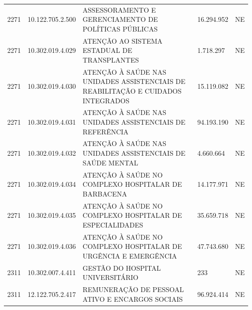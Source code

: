 \documentclass{article}
\begin{document}
\begin{longtable}[c]{m{1cm}|m{2cm}|m{10cm}|m{2cm}|m{1cm}}
\multicolumn{1}{C{1cm}|}{2271} & \multicolumn{1}{C{2cm}|}{10.122.705.2.500} & \multicolumn{1}{L{10cm}|}{ASSESSORAMENTO E GERENCIAMENTO DE POLÍTICAS PÚBLICAS} & \multicolumn{1}{R{2cm}|}{16.294.952} & \multicolumn{1}{C{1cm}}{NE} \\
\multicolumn{1}{C{1cm}|}{2271} & \multicolumn{1}{C{2cm}|}{10.302.019.4.029} & \multicolumn{1}{L{10cm}|}{ATENÇÃO AO SISTEMA ESTADUAL DE TRANSPLANTES} & \multicolumn{1}{R{2cm}|}{1.718.297} & \multicolumn{1}{C{1cm}}{NE} \\
\multicolumn{1}{C{1cm}|}{2271} & \multicolumn{1}{C{2cm}|}{10.302.019.4.030} & \multicolumn{1}{L{10cm}|}{ATENÇÃO À SAÚDE NAS UNIDADES ASSISTENCIAIS DE REABILITAÇÃO E CUIDADOS INTEGRADOS} & \multicolumn{1}{R{2cm}|}{15.119.082} & \multicolumn{1}{C{1cm}}{NE} \\
\multicolumn{1}{C{1cm}|}{2271} & \multicolumn{1}{C{2cm}|}{10.302.019.4.031} & \multicolumn{1}{L{10cm}|}{ATENÇÃO À SAÚDE NAS UNIDADES ASSISTENCIAIS DE REFERÊNCIA} & \multicolumn{1}{R{2cm}|}{94.193.190} & \multicolumn{1}{C{1cm}}{NE} \\
\multicolumn{1}{C{1cm}|}{2271} & \multicolumn{1}{C{2cm}|}{10.302.019.4.032} & \multicolumn{1}{L{10cm}|}{ATENÇÃO À SAÚDE NAS UNIDADES ASSISTENCIAIS DE SAÚDE MENTAL} & \multicolumn{1}{R{2cm}|}{4.660.664} & \multicolumn{1}{C{1cm}}{NE} \\
\multicolumn{1}{C{1cm}|}{2271} & \multicolumn{1}{C{2cm}|}{10.302.019.4.034} & \multicolumn{1}{L{10cm}|}{ATENÇÃO À SAÚDE NO COMPLEXO HOSPITALAR DE BARBACENA} & \multicolumn{1}{R{2cm}|}{14.177.971} & \multicolumn{1}{C{1cm}}{NE} \\
\multicolumn{1}{C{1cm}|}{2271} & \multicolumn{1}{C{2cm}|}{10.302.019.4.035} & \multicolumn{1}{L{10cm}|}{ATENÇÃO À SAÚDE NO COMPLEXO HOSPITALAR DE ESPECIALIDADES} & \multicolumn{1}{R{2cm}|}{35.659.718} & \multicolumn{1}{C{1cm}}{NE} \\
\multicolumn{1}{C{1cm}|}{2271} & \multicolumn{1}{C{2cm}|}{10.302.019.4.036} & \multicolumn{1}{L{10cm}|}{ATENÇÃO À SAÚDE NO COMPLEXO HOSPITALAR DE URGÊNCIA E EMERGÊNCIA} & \multicolumn{1}{R{2cm}|}{47.743.680} & \multicolumn{1}{C{1cm}}{NE} \\
\multicolumn{1}{C{1cm}|}{2311} & \multicolumn{1}{C{2cm}|}{10.302.007.4.411} & \multicolumn{1}{L{10cm}|}{GESTÃO DO HOSPITAL UNIVERSITÁRIO} & \multicolumn{1}{R{2cm}|}{233} & \multicolumn{1}{C{1cm}}{NE} \\
\multicolumn{1}{C{1cm}|}{2311} & \multicolumn{1}{C{2cm}|}{12.122.705.2.417} & \multicolumn{1}{L{10cm}|}{REMUNERAÇÃO DE PESSOAL ATIVO E ENCARGOS SOCIAIS} & \multicolumn{1}{R{2cm}|}{96.924.414} & \multicolumn{1}{C{1cm}}{NE} \\

\end{longtable}
\end{document}
